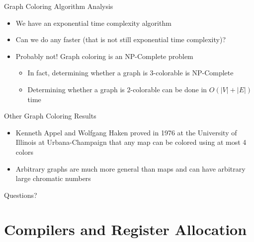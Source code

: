 \documentclass[aspectratio=169]{beamer}
\begin{document}
\begin{frame}{Graph Coloring Algorithm Analysis}
    \begin{itemize}
        \item We have an exponential time complexity algorithm
        \item Can we do any faster (that is not still exponential time complexity)?
        \pause
        \item Probably not! Graph coloring is an NP-Complete problem
        \pause
        \begin{itemize}
            \item In fact, determining whether a graph is 3-colorable is NP-Complete
            \pause
            \item Determining whether a graph is 2-colorable can be done in $O(|V| + |E|)$ time
        \end{itemize}
    \end{itemize}
\end{frame}

\begin{frame}{Other Graph Coloring Results}
    \begin{itemize}
        \item Kenneth Appel and Wolfgang Haken proved in 1976 at the University of Illinois at Urbana-Champaign that any map can be colored using at most 4 colors
        \pause
        \item Arbitrary graphs are much more general than maps and can have arbitrary large chromatic numbers
    \end{itemize}
\end{frame}

\begin{frame}{}
      \begin{center}
    {\color{sigma@mainblue} \LARGE Questions?}
  \end{center}
\end{frame}

\section{Compilers and Register Allocation}
\frame{\sectionpage}
\end{document}
